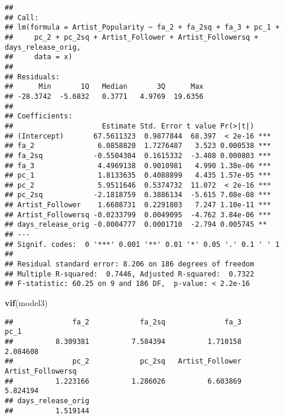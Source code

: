 \documentclass[
]{article}
\newenvironment{Shaded}{\begin{snugshade}}{\end{snugshade}}
\newcommand{\DataTypeTok}[1]{\textcolor[rgb]{0.13,0.29,0.53}{#1}}
\newcommand{\KeywordTok}[1]{\textcolor[rgb]{0.13,0.29,0.53}{\textbf{#1}}}
\newcommand{\NormalTok}[1]{#1}
\newcommand{\OperatorTok}[1]{\textcolor[rgb]{0.81,0.36,0.00}{\textbf{#1}}}
\newcommand{\StringTok}[1]{\textcolor[rgb]{0.31,0.60,0.02}{#1}}
\begin{document}
\begin{verbatim}
## 
## Call:
## lm(formula = Artist_Popularity ~ fa_2 + fa_2sq + fa_3 + pc_1 + 
##     pc_2 + pc_2sq + Artist_Follower + Artist_Followersq + days_release_orig, 
##     data = x)
## 
## Residuals:
##      Min       1Q   Median       3Q      Max 
## -28.3742  -5.6832   0.3771   4.9769  19.6356 
## 
## Coefficients:
##                     Estimate Std. Error t value Pr(>|t|)    
## (Intercept)       67.5611323  0.9877844  68.397  < 2e-16 ***
## fa_2               6.0858820  1.7276487   3.523 0.000538 ***
## fa_2sq            -0.5504304  0.1615332  -3.408 0.000803 ***
## fa_3               4.4969138  0.9010981   4.990 1.38e-06 ***
## pc_1               1.8133635  0.4088899   4.435 1.57e-05 ***
## pc_2               5.9511646  0.5374732  11.072  < 2e-16 ***
## pc_2sq            -2.1818759  0.3886134  -5.615 7.08e-08 ***
## Artist_Follower    1.6608731  0.2291803   7.247 1.10e-11 ***
## Artist_Followersq -0.0233799  0.0049095  -4.762 3.84e-06 ***
## days_release_orig -0.0004777  0.0001710  -2.794 0.005745 ** 
## ---
## Signif. codes:  0 '***' 0.001 '**' 0.01 '*' 0.05 '.' 0.1 ' ' 1
## 
## Residual standard error: 8.206 on 186 degrees of freedom
## Multiple R-squared:  0.7446, Adjusted R-squared:  0.7322 
## F-statistic: 60.25 on 9 and 186 DF,  p-value: < 2.2e-16
\end{verbatim}

\begin{Shaded}
\begin{Highlighting}[]
\KeywordTok{vif}\NormalTok{(model3)}
\end{Highlighting}
\end{Shaded}

\begin{verbatim}
##              fa_2            fa_2sq              fa_3              pc_1 
##          8.309381          7.584394          1.710158          2.084608 
##              pc_2            pc_2sq   Artist_Follower Artist_Followersq 
##          1.223166          1.286026          6.603869          5.824194 
## days_release_orig 
##          1.519144
\end{verbatim}

\begin{Shaded}
\end{Shaded}
\end{document}
